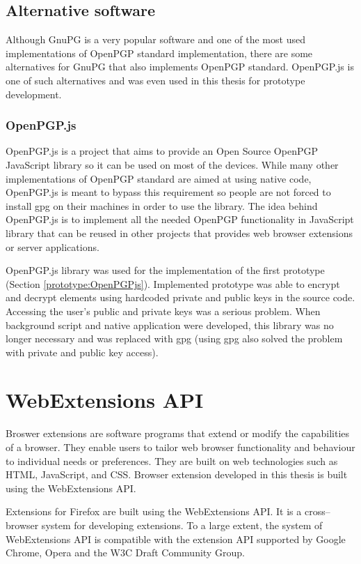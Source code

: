 \section{Alternative software}
Although GnuPG is a very popular software and one of the most used implementations of OpenPGP standard implementation, there are some alternatives for GnuPG that also implements OpenPGP standard. OpenPGP.js is one of such alternatives and was even used in this thesis for prototype development.

\subsection*{OpenPGP.js}
\label{text:openpgpjs}
OpenPGP.js is a project that aims to provide an Open Source OpenPGP JavaScript library so it can be used on most of the devices. While many other implementations of OpenPGP standard are aimed at using native code, OpenPGP.js is meant to bypass this requirement so people are not forced to install gpg on their machines in order to use the library. The idea behind OpenPGP.js is to implement all the needed OpenPGP functionality in JavaScript library that can be reused in other projects that provides web browser extensions or server applications. \cite{OpenPGPjs}

OpenPGP.js library was used for the implementation of the first prototype (Section \ref{prototype:OpenPGPjs}). Implemented prototype was able to encrypt and decrypt elements using hardcoded private and public keys in the source code. Accessing the user's public and private keys was a serious problem.  When background script and native application were developed, this library was no longer necessary and was replaced with gpg (using gpg also solved the problem with private and public key access).

\chapter{WebExtensions API}
Broswer extensions are software programs that extend or modify the capabilities of a browser. They enable users to tailor web browser functionality and behaviour to individual needs or preferences. They are built on web technologies such as HTML, JavaScript, and CSS. Browser extension developed in this thesis is built using the WebExtensions API. \cite{chromeExtensions}

Extensions for Firefox are built using the WebExtensions API. It is a cross--browser system for developing extensions. To a large extent, the system of WebExtensions API is compatible with the extension API supported by Google Chrome, Opera and the W3C Draft Community Group. \cite{firefoxExtensions}

